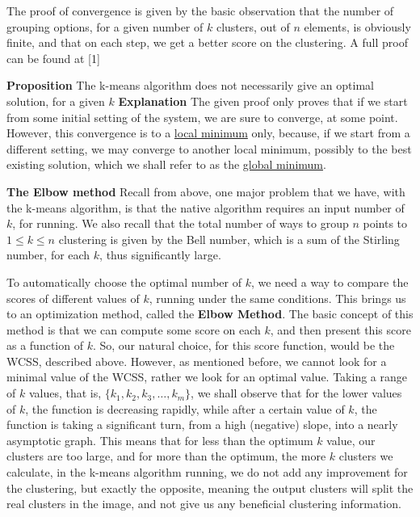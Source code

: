 \documentclass[12pt]{article}
\begin{document}
The proof of convergence is given by the basic observation that the number of grouping options, for a given number of $k$ clusters, out of \(n \) elements, is obviously finite, and that on each step, we get a better score on the clustering.
A full proof can be found at [1] \newline

\textbf{Proposition} The k-means algorithm does not necessarily give an optimal solution, for a given $k$\newline
\textbf{Explanation} The given proof only proves that if we start from some initial setting of the system, we are sure to converge, at some point. However, this convergence is to a \underline{local minimum} only, because, if we start from a different setting, we may converge to another local minimum, possibly to the best existing solution, which we shall refer to as the \underline{global minimum}. \newline

\textbf{The Elbow method} \newline
Recall from above, one major problem that we have, with the k-means algorithm, is that the native algorithm requires an input number of $k$, for running. We also recall that the total number of ways to group \( n \) points to \( 1 \leq k \leq n \) clustering is given by the Bell number, which is a sum of the Stirling number, for each $k$, thus significantly large. \newline

To automatically choose the optimal number of $k$, we need a way to compare the scores of different values of $k$, running under the same conditions. This brings us to an optimization method, called the \textbf{Elbow Method}. The basic concept of this method is that we can compute some score on each $k$, and then present this score as a function of $k$. \newline
So, our natural choice, for this score function, would be the WCSS, described above. \newline 
However, as mentioned before, we cannot look for a minimal value of the WCSS, rather we look for an optimal value.
Taking a range of $k$ values, that is, \( \{k_1,k_2,k_3,…,k_m \} \), we shall observe that for the lower values of $k$, the function is decreasing rapidly, while after a certain value of $k$, the function is taking a significant turn, from a high (negative) slope, into a nearly asymptotic graph. 
This means that for less than the optimum $k$ value, our clusters are too large, and for more than the optimum, the more $k$ clusters we calculate, in the k-means algorithm running, we do not add any improvement for the clustering, but exactly the opposite, meaning the output clusters will split the real clusters in the image, and not give us any beneficial clustering information. \newline
\end{document}
